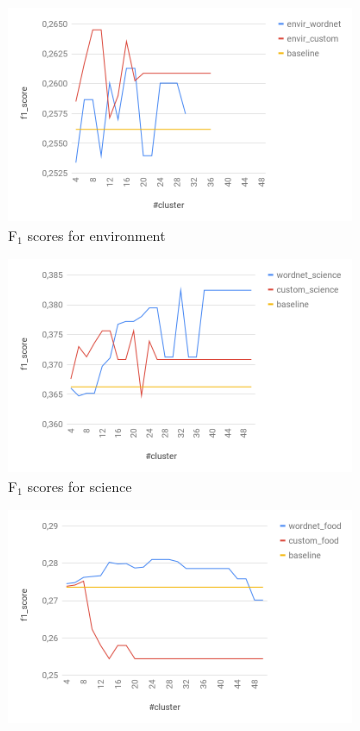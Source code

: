 \documentclass[12pt, headsepline, a4paper]{scrartcl}
\begin{document}
\begin{figure}[H]
	\begin{subfigure}{0.50 \textwidth}
		\includegraphics[width=1\textwidth]{images/environment_outlier.png}
		\caption{F$_1$ scores for environment}
	\end{subfigure}
	\begin{subfigure}{0.50 \textwidth}
		\includegraphics[width=1\textwidth]{images/science_outlier.png}
		\caption{F$_1$ scores for science}
	\end{subfigure}
	\begin{subfigure}{0.50 \textwidth}
		\includegraphics[width=1\textwidth]{images/food_outlier.png}

\end{subfigure}
\end{figure}
\end{document}
